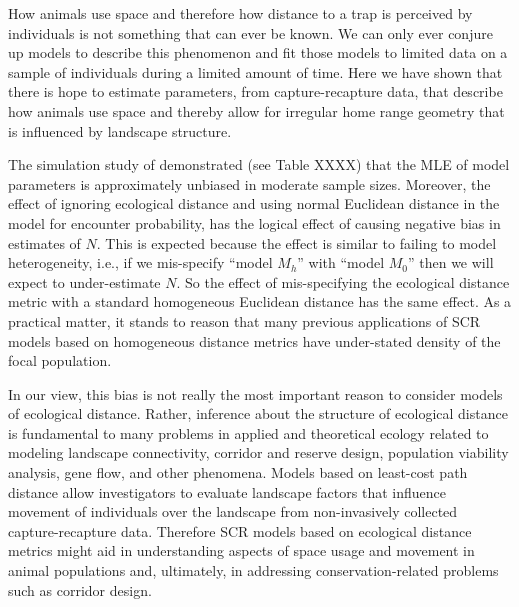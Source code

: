 How animals use space and therefore how distance to a trap is
perceived by individuals is not something that can ever be known. We
can only ever conjure up models to describe this phenomenon and fit
those models to limited data on a sample of individuals during a
limited amount of time.  Here we have shown that there is hope to
estimate parameters, from capture-recapture data, that describe how
animals use space and thereby allow for irregular home range geometry
that is influenced by landscape structure.

The simulation study of \citet{royle_etal:2012ecol} demonstrated (see
Table XXXX) that the MLE of model parameters is approximately unbiased
in moderate sample sizes. Moreover, the effect of ignoring ecological
distance and using normal Euclidean distance in the model for
encounter probability, has the logical effect of causing negative bias
in estimates of $N$.  This is expected because the effect is similar
to failing to model heterogeneity, i.e., if we mis-specify ``model
$M_h$'' \citep{otis_etal:1978} with ``model $M_0$''
\citep{otis_etal:1978} then we will expect to under-estimate $N$. So
the effect of mis-specifying the ecological distance metric with a
standard homogeneous Euclidean distance has the same effect. As a
practical matter, it stands to reason that many previous applications
of SCR models based on homogeneous distance metrics have under-stated
density of the focal population.

In our view, this bias is not really the most important reason to
consider models of ecological distance. Rather, inference about the
structure of ecological distance is fundamental to many problems in
applied and theoretical ecology related to modeling landscape
connectivity, corridor and reserve design, population viability
analysis, gene flow, and other phenomena.  Models based on least-cost
path distance allow 
investigators to evaluate landscape factors that influence movement of
individuals over the landscape from non-invasively collected
capture-recapture data.  Therefore SCR models based on ecological
distance metrics might aid in understanding
aspects of space usage and movement in animal populations and, ultimately, in addressing conservation-related problems such as corridor design.


